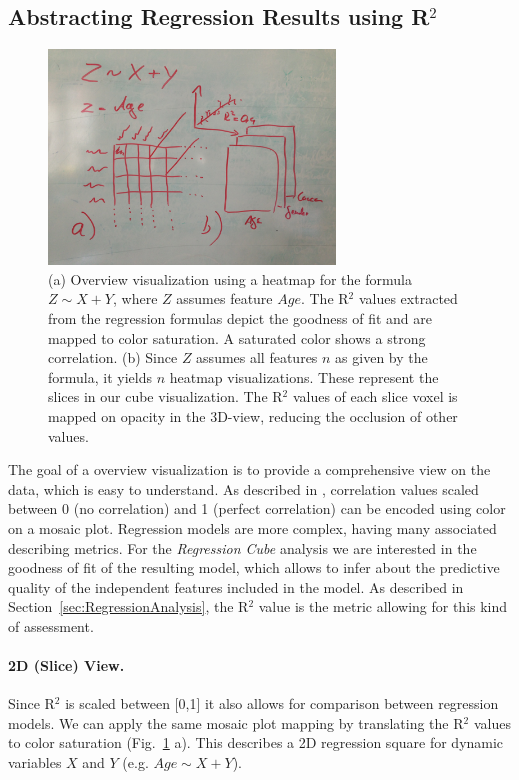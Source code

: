\documentclass[journal]{style/vgtc} 			          %
\begin{document}
\subsection{Abstracting Regression Results using R$^2$}
\begin{figure}[htb]
 \centering
 \includegraphics[width=3.0in]{figures/cube_sketch}
 \caption{
 (a) Overview visualization using a heatmap for the formula $Z \sim X + Y$, where $Z$ assumes feature $Age$.
 The R$^2$ values extracted from the regression formulas depict the goodness of fit and are mapped to color saturation.
 A saturated color shows a strong correlation.
 (b) Since $Z$ assumes all features $n$ as given by the formula, it yields $n$ heatmap visualizations.
 These represent the slices in our cube visualization.
 The R$^2$ values of each slice voxel is mapped on opacity in the 3D-view, reducing the occlusion of other values.
 }
  \label{fig:Cube}
\end{figure}
The goal of a overview visualization is to provide a comprehensive view on the data, which is easy to understand.
As described in \cite{Klemm2014VIS}, correlation values scaled between 0 (no correlation) and 1 (perfect correlation) can be encoded using color on a mosaic plot.
Regression models are more complex, having many associated describing metrics.
For the \emph{Regression Cube} analysis we are interested in the goodness of fit of the resulting model, which allows to infer about the predictive quality of the independent features included in the model.
As described in Section~\ref{sec:RegressionAnalysis}, the R$^2$ value is the metric allowing for this kind of assessment.
\paragraph{2D (Slice) View.}
Since R$^2$ is scaled between [0,1] it also allows for comparison between regression models.
We can apply the same mosaic plot mapping by translating the R$^2$ values to color saturation (Fig.~\ref{fig:Cube} a).
This describes a 2D regression square for dynamic variables $X$ and $Y$ (e.g. $Age \sim X + Y$).
\end{document}
